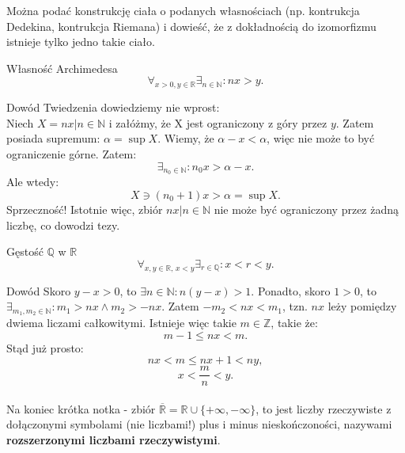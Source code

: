 \documentclass{article}
\newcommand{\R}{\mathbb{R}}
\newcommand{\N}{\mathbb{N}}
\newcommand{\Z}{\mathbb{Z}}
\newcommand{\Q}{\mathbb{Q}}
\newcommand{\oo}{\infty}
\begin{document}
    Można podać konstrukcję ciała o podanych własnościach (np. kontrukcja Dedekina, kontrukcja Riemana) i dowieść, że z dokładnością do izomorfizmu istnieje tylko jedno takie ciało.
    
    \begin{twier}{Własność Archimedesa}
        \begin{equation}
            \forall_{x > 0, y \in \R} \exists_{n \in \N}: nx > y. 
        \end{equation}
    \end{twier}


    \begin{dow}{Dowód}
        Twiedzenia dowiedziemy nie wprost:\\
        Niech $X = {nx | n \in \N}$ i załóżmy, że X jest ograniczony z góry przez $y$. Zatem posiada supremum: $\alpha = \sup X$. Wiemy, że $\alpha - x < \alpha$, więc nie może to być ograniczenie górne. Zatem:
        \[ \exists_{n_0 \in \N}: n_0 x > \alpha - x. \]
        Ale wtedy:
        \[ X \ni (n_0 + 1) x > \alpha = \sup X. \]
        Sprzeczność! Istotnie więc, zbiór ${nx | n \in \N}$ nie może być ograniczony przez żadną liczbę, co dowodzi tezy.
    \end{dow}

    \begin{twier}{Gęstość $\Q$ w $\R$}
        \begin{equation}
            \forall_{x, y \in \R, \, x < y} \exists_{r \in \Q}: x < r < y.
        \end{equation}
    \end{twier}
    \begin{dow}{Dowód}
        Skoro $y - x > 0$, to $\exists{n \in \N}: n(y - x) > 1$. Ponadto, skoro $1 > 0$, to $\exists_{m_1, m_2 \in \N}: m_1 > n x \land m_2 > -nx$. Zatem $-m_2 < nx < m_1$, tzn. $nx$ leży pomiędzy dwiema liczami całkowitymi. Istnieje więc takie $m \in \Z$, takie że:
        \[ m-1 \leqslant nx < m. \]
        Stąd już prosto:
        \[nx < m \leqslant nx +1 < ny,\]
        \[x < \frac{m}{n} < y.\]
    \end{dow}

    \paragraph*{} Na koniec krótka notka - zbiór $\overline{\R} = \R \cup \{+\oo, -\oo\}$, to jest liczby rzeczywiste z dołączonymi symbolami (nie liczbami!) plus i minus nieskończoności, nazywami \textbf{rozszerzonymi liczbami rzeczywistymi}.
\end{document}
